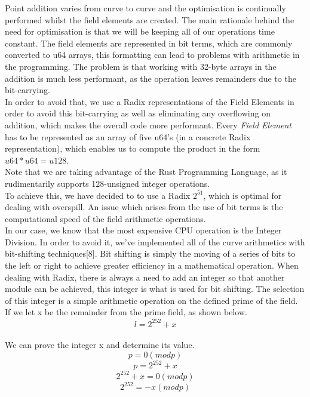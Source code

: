\documentclass[letterpaper, 10 pt, conference]{ieeeconf}  %
\begin{document}
Point addition varies from curve to curve and the optimisation is continually performed whilst the field elements are created. The main rationale behind the need for optimisation is that we will be keeping all of our operations time constant. The field elements are represented in bit terms, which are commonly converted to u64 arrays, this formatting can lead to problems with arithmetic in the programming.  The problem is that working with 32-byte arrays in the addition is much less performant, as the operation leaves remainders due to the bit-carrying.\\
In order to avoid that, we use a Radix representations of the Field Elements in order to avoid this bit-carrying as well as eliminating any overflowing on addition, which makes the overall code more performant. Every \textit{Field Element} has to be represented as an array of five u64's (in a concrete Radix representation), which enables us to compute the product in the form $ u64 * u64 = u128 $.\\  Note that we are taking advantage of the Rust Programming Language, as it rudimentarily supports 128-unsigned integer operations.
\\
To achieve this, we have decided to to use a Radix $ 2^{51} $, which is optimal for dealing with overspill. An issue which arises from the use of bit terms is the computational speed of the field arithmetic operations. \\
In our case, we know that the most expensive CPU operation is the Integer Division. In order to avoid it, we've implemented all of the curve arithmetics with bit-shifting techniques[8]. Bit shifting is simply the moving of a series of bits to the left or right to achieve greater efficiency in a mathematical operation. When dealing with Radix, there is always a need to add an integer so that another module can be achieved, this integer is what is used for bit shifting. The selection of this integer is a simple arithmetic operation on the defined prime of the field. 
If we let x be the remainder from the prime field, as shown below.\\

$$ l = 2^{252}+x $$\\

We can prove the integer x and determine its value.\\

        $$ p = 0(modp) $$  
        $$ p = 2^{252}+x $$
$$ 2^{252}+x = 0(modp) $$
  $$ 2^{252} = -x(modp) $$ \\
\end{document}
